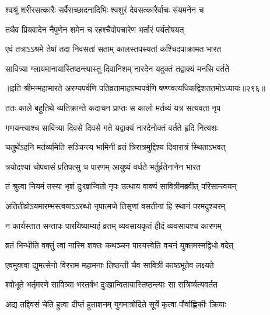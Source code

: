 \begin{center}
\twolineshloka
{श्वश्रूं शरीरसत्कारैः सर्वैराच्छादनादिभिः}
{श्वशुरं देवसत्कारैर्वाचः संयमनेन च}

\twolineshloka
{तथैव प्रियवादेन नैपुणेन शमेन च}
{रहश्चैवोपचारेण भर्तारं पर्यतोषयत्}

\twolineshloka
{एवं तत्राऽऽश्रमे तेषां तदा निवसतां सताम्}
{कालस्तपस्यतां कश्चिदपाक्रामत भारत}

\twolineshloka
{सावित्र्या ग्लायमानायास्तिष्ठन्त्यास्तु दिवानिशम्}
{नारदेन यदुक्तं तद्वाक्यं मनसि वर्तते}

॥इति श्रीमन्महाभारते अरण्यपर्वणि पतिव्रतामाहात्म्यपर्वणि षण्णवत्यधिकद्विशततमोऽध्यायः॥२९६॥

\resetShloka


\twolineshloka
{ततः काले बहुतिथे व्यतिक्रान्ते कदाचन}
{प्राप्तः स कालो मर्तव्यं यत्र सत्यवता नृप}

\twolineshloka
{गणयन्त्याश्च सावित्र्या दिवसे दिवसे गते}
{यद्वाक्यं नारदेनोक्तं वर्तते हृदि नित्यशः}

\twolineshloka
{चतुर्थेऽहनि मर्तव्यमिति सञ्चिन्त्य भामिनी}
{व्रतं त्रिरात्रमुद्दिश्य दिवारात्रं स्थिताऽभवत्}

\twolineshloka
{त्रयोदश्यां चोपवासं प्रतिपत्सु च पारणम्}
{आयुष्यं वर्धते भर्तुर्व्रतेनानेन भारत}

\twolineshloka
{तं श्रुत्वा नियमं तस्या भृशं दुःखान्वितो नृपः}
{उत्थाय वाक्यं सावित्रीमब्रवीत् परिसान्त्वयन्}

\twolineshloka
{अतितीव्रोऽयमारम्भस्त्वयाऽऽरब्धो नृपात्मजे}
{तिसृणां वसतीनां हि स्थानं परमदुश्चरम्}


\twolineshloka
{न कार्यस्तात सन्तापः पारयिष्याम्यहं व्रतम्}
{व्यवसायकृतं हीदं व्यवसायश्च कारणम्}


\twolineshloka
{व्रतं भिन्धीति वक्तुं त्वां नास्मि शक्तः कथञ्चन}
{पारयस्वेति वचनं युक्तमस्मद्विधो वदेत्}


\twolineshloka
{एवमुक्त्वा द्युमत्सेनो विरराम महामनाः}
{तिष्ठन्ती चैव सावित्री काष्ठभूतेव लक्ष्यते}

\twolineshloka
{श्वोभूते भर्तृमरणे सावित्र्या भरतर्षभ}
{दुःखान्वितायास्तिष्ठन्त्याः सा रात्रिर्व्यत्यवर्तत}

\twolineshloka
{अद्य तद्दिवसं चेति हुत्वा दीप्तं हुताशनम्}
{युगमात्रोदिते सूर्ये कृत्वा पौर्वाह्णिकीः क्रियाः}


\end{center}
